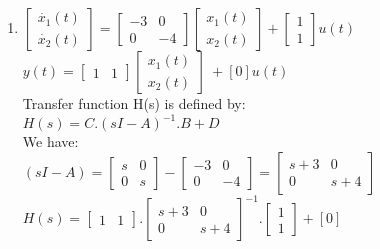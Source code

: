 \documentclass[14pt,a4paper]{article}
\begin{document}
\begin{enumerate}
	\doublespacing
	\item 
	$\begin{bmatrix}\dot{x_1}(t)\\ \dot{x_2}(t) \end{bmatrix} = \begin{bmatrix}-3&0 \\0&-4 \end{bmatrix} \begin{bmatrix}x_1(t) \\ x_2(t) \end{bmatrix} + \begin{bmatrix} 1\\1 \end{bmatrix}u(t)$ \\
	
	$y(t) = \begin{bmatrix} 1&1 \end{bmatrix} \begin{bmatrix} x_1(t)\\x_2(t) \end{bmatrix}\ + [0]u(t) $ \\
	
	Transfer function H(s) is defined by:\\
	$H(s) = C.(sI-A)^{-1}.B + D$ \\ 
	We have: \\
	$(sI-A) = \begin{bmatrix} s&0 \\ 0&s	\end{bmatrix} - \begin{bmatrix}
	-3 & 0 \\ 0 & -4 \end{bmatrix} = \begin{bmatrix} s+3 & 0 \\ 0 & s+4	\end{bmatrix}$\\
	
	$H(s) = \begin{bmatrix}1&1\end{bmatrix}.\begin{bmatrix} s+3 & 0 \\ 0 & s+4	\end{bmatrix}^{-1}.\begin{bmatrix} 1 \\ 1\end{bmatrix} + [0]$ \\
	

\end{enumerate}
\end{document}

